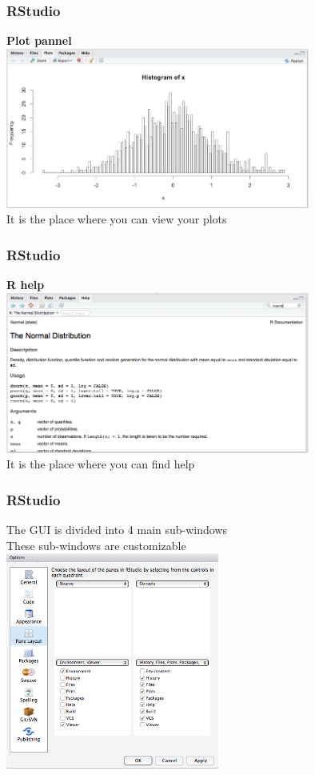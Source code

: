 \documentclass{beamer}
\begin{document}
\begin{frame}
	\frametitle{RStudio}
	\textbf{Plot pannel}\\
	\vspace{20pt}
	\centering \includegraphics[width=10cm]{figures/RStudio_plot.png}\\
	\small It is the place where you can view your plots
\end{frame}

\begin{frame}
	\frametitle{RStudio}
	\textbf{R help}\\
	\vspace{20pt}
	\centering \includegraphics[width=10cm]{figures/RStudio_help.png}\\
	\small It is the place where you can find help
\end{frame}

\begin{frame}
	\frametitle{RStudio}
	The GUI is divided into 4 main sub-windows\\
	These sub-windows are customizable\\
	\vspace{10pt}
	\centering \includegraphics[width=7cm]{figures/RStudio_option.png}
\end{frame}
\end{document}
